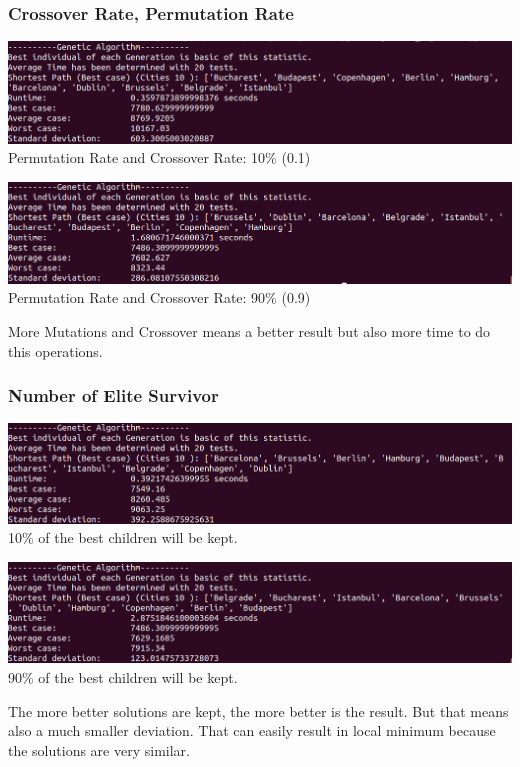 \documentclass[10pt,a4paper]{article}
\begin{document}
	\subsubsection{Crossover Rate, Permutation Rate}
	\begin{center}
		\includegraphics[width=1\linewidth]{pictures/geneticAlgorithm/rate0_1}
		\\
		Permutation Rate and Crossover Rate: 10\% (0.1)
		\\
	\end{center}
	\begin{center}
		\includegraphics[width=1\linewidth]{pictures/geneticAlgorithm/rate0_9}
		\\
		Permutation Rate and Crossover Rate: 90\% (0.9)
		\\
	\end{center}
	More Mutations and Crossover means a better result but also more time to do this operations.
	
	\subsubsection{Number of Elite Survivor}
	\begin{center}
		\includegraphics[width=1\linewidth]{pictures/geneticAlgorithm/10elite}
		\\
		10\% of the best children will be kept.
		\\
	\end{center}
	\begin{center}
		\includegraphics[width=1\linewidth]{pictures/geneticAlgorithm/90elite}
	\\
	90\% of the best children will be kept.
	\\	
	\end{center}
	The more better solutions are kept, the more better is the result. But that means also a much smaller deviation. That can easily result in local minimum because the solutions are very similar.
	
\end{document}
